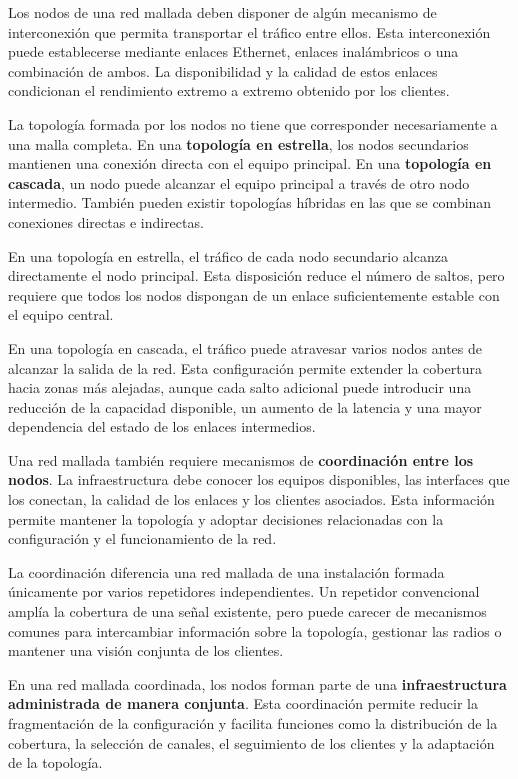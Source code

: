 Los nodos de una red mallada deben disponer de algún mecanismo de
interconexión que permita transportar el tráfico entre ellos. Esta
interconexión puede establecerse mediante enlaces Ethernet, enlaces
inalámbricos o una combinación de ambos. La disponibilidad y la calidad
de estos enlaces condicionan el rendimiento extremo a extremo obtenido
por los clientes.

La topología formada por los nodos no tiene que corresponder
necesariamente a una malla completa. En una
\textbf{topología en estrella}, los nodos secundarios mantienen una
conexión directa con el equipo principal. En una
\textbf{topología en cascada}, un nodo puede alcanzar el equipo principal
a través de otro nodo intermedio. También pueden existir topologías
híbridas en las que se combinan conexiones directas e indirectas.

En una topología en estrella, el tráfico de cada nodo secundario alcanza
directamente el nodo principal. Esta disposición reduce el número de
saltos, pero requiere que todos los nodos dispongan de un enlace
suficientemente estable con el equipo central.

En una topología en cascada, el tráfico puede atravesar varios nodos antes
de alcanzar la salida de la red. Esta configuración permite extender la
cobertura hacia zonas más alejadas, aunque cada salto adicional puede
introducir una reducción de la capacidad disponible, un aumento de la
latencia y una mayor dependencia del estado de los enlaces intermedios.

Una red mallada también requiere mecanismos de
\textbf{coordinación entre los nodos}. La infraestructura debe conocer
los equipos disponibles, las interfaces que los conectan, la calidad de
los enlaces y los clientes asociados. Esta información permite mantener
la topología y adoptar decisiones relacionadas con la configuración y el
funcionamiento de la red.

La coordinación diferencia una red mallada de una instalación formada
únicamente por varios repetidores independientes. Un repetidor
convencional amplía la cobertura de una señal existente, pero puede
carecer de mecanismos comunes para intercambiar información sobre la
topología, gestionar las radios o mantener una visión conjunta de los
clientes.

En una red mallada coordinada, los nodos forman parte de una
\textbf{infraestructura administrada de manera conjunta}. Esta
coordinación permite reducir la fragmentación de la configuración y
facilita funciones como la distribución de la cobertura, la selección de
canales, el seguimiento de los clientes y la adaptación de la topología.

